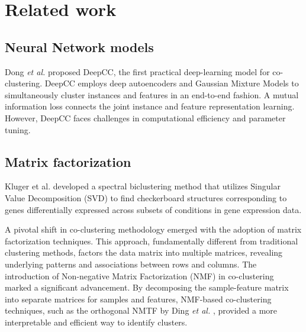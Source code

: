 

\section{Related work}
\subsection{Neural Network models}
Dong \textit{et al.}\cite{dongkuanxu2019DeepCoClustering} proposed DeepCC, the first practical deep-learning model for co-clustering. DeepCC employs deep autoencoders and Gaussian Mixture Models to simultaneously cluster instances and features in an end-to-end fashion. A mutual information loss connects the joint instance and feature representation learning.
However, DeepCC faces challenges in computational efficiency and parameter tuning. 

\subsection{Matrix factorization}
Kluger et al. \cite{kluger2003SpectralBiclusteringMicroarray} developed a spectral biclustering method that utilizes Singular Value Decomposition (SVD) to find checkerboard structures corresponding to genes differentially expressed across subsets of conditions in gene expression data.   

A pivotal shift in co-clustering methodology emerged with the adoption of matrix factorization techniques. This approach, fundamentally different from traditional clustering methods, factors the data matrix into multiple matrices, revealing underlying patterns and associations between rows and columns. The introduction of Non-negative Matrix Factorization (NMF) in co-clustering marked a significant advancement. By decomposing the sample-feature matrix into separate matrices for samples and features, NMF-based co-clustering techniques, such as the orthogonal NMTF by Ding \textit{et al.} \cite{ding2006OrthogonalNonnegativeMatrix}, provided a more interpretable and efficient way to identify clusters. 

